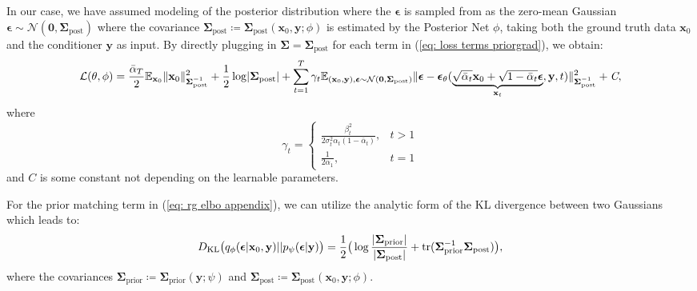 In our case, we have assumed modeling of the posterior distribution where the $\boldsymbol{\epsilon}$ is sampled from as the zero-mean Gaussian $\boldsymbol{\epsilon}\sim\mathcal{N}(\mathbf{0},\boldsymbol{\Sigma}_{\text{post}})$ where the covariance $\boldsymbol{\Sigma}_{\text{post}}\coloneq\boldsymbol{\Sigma}_{\text{post}}(\mathbf{x}_0,\mathbf{y};\phi)$ is estimated by the Posterior Net $\phi$, taking both the ground truth data $\mathbf{x}_0$ and the conditioner $\mathbf{y}$ as input.
By directly plugging in $\boldsymbol{\Sigma}=\boldsymbol{\Sigma}_{\text{post}}$ for each term in (\ref{eq: loss terms priorgrad}), we obtain:
\begin{equation}
    \mathcal{L}(\theta,\phi)=\frac{\bar{\alpha}_T}{2}\mathbb{E}_{\mathbf{x}_0}\lVert\mathbf{x}_0\rVert^2_{\boldsymbol{\Sigma}^{-1}_{\text{post}}}+\frac{1}{2}\log\lvert\boldsymbol{\Sigma}_{\text{post}}\rvert 
    +\sum_{t=1}^{T}\gamma_t\mathbb{E}_{(\mathbf{x}_0,\mathbf{y}),\boldsymbol{\epsilon}\sim\mathcal{N}(\mathbf{0},\boldsymbol{\Sigma}_{\text{post}})}\lVert\boldsymbol{\epsilon}-\boldsymbol{\epsilon}_\theta(\underbrace{\sqrt{\bar{\alpha}_t}\mathbf{x}_0+\sqrt{1-\bar{\alpha}_t}\boldsymbol{\epsilon}}_{\mathbf{x}_t},\mathbf{y},t)\rVert^2_{\boldsymbol{\Sigma}^{-1}_{\text{post}}}+\textit{C},
\label{eq: prop 2 ddpm}
\end{equation}
where
\begin{equation*}
    \gamma_t= 
        \begin{cases}
        \frac{\beta_t^2}{2\sigma_t^2\alpha_t(1-\bar{\alpha}_t)}, & t>1 \\
        \frac{1}{2\alpha_1}, & t=1
        \end{cases}
\end{equation*}
and $C$ is some constant not depending on the learnable parameters.

For the prior matching term in (\ref{eq: rg elbo appendix}), we can utilize the analytic form of the KL divergence between two Gaussians which leads to:
\begin{equation}
    D_{\text{KL}}\bigr(q_{\phi}(\boldsymbol{\epsilon}|\mathbf{x}_0,\mathbf{y}) || p_{\psi}(\boldsymbol{\epsilon}|\mathbf{y})\bigr)=\frac{1}{2}\bigr(\log\frac{\lvert\boldsymbol{\Sigma}_{\text{prior}}\rvert}{\lvert\boldsymbol{\Sigma}_{\text{post}}\rvert}+\text{tr}(\boldsymbol{\Sigma}_{\text{prior}}^{-1}\boldsymbol{\Sigma}_{\text{post}})\bigr),
\label{eq: prop 2 kl div}
\end{equation}
where the covariances $\boldsymbol{\Sigma}_{\text{prior}}\coloneq\boldsymbol{\Sigma}_{\text{prior}}(\mathbf{y};\psi)$ and $\boldsymbol{\Sigma}_{\text{post}}\coloneq\boldsymbol{\Sigma}_{\text{post}}(\mathbf{x}_0,\mathbf{y};\phi)$.


